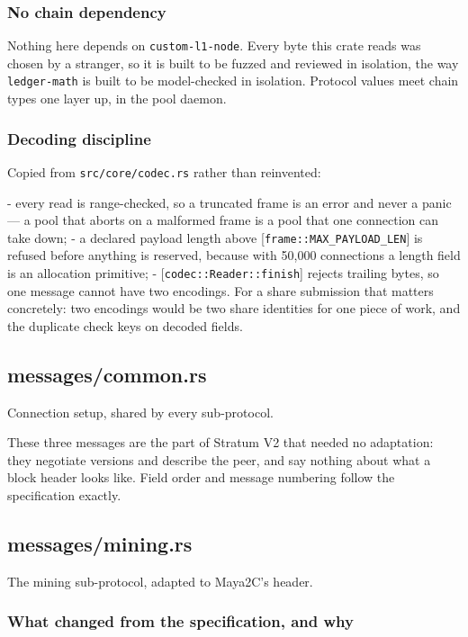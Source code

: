 \documentclass[11pt,a4paper]{article}
\begin{document}
\subsubsection{No chain dependency}

Nothing here depends on \texttt{custom-l1-node}. Every byte this crate reads was
chosen by a stranger, so it is built to be fuzzed and reviewed in isolation,
the way \texttt{ledger-math} is built to be model-checked in isolation. Protocol
values meet chain types one layer up, in the pool daemon.

\subsubsection{Decoding discipline}

Copied from \texttt{src/core/codec.rs} rather than reinvented:

- every read is range-checked, so a truncated frame is an error and never a
  panic — a pool that aborts on a malformed frame is a pool that one
  connection can take down;
- a declared payload length above [\texttt{frame::MAX\_PAYLOAD\_LEN}] is refused
  before anything is reserved, because with 50,000 connections a length
  field is an allocation primitive;
- [\texttt{codec::Reader::finish}] rejects trailing bytes, so one message cannot
  have two encodings. For a share submission that matters concretely: two
  encodings would be two share identities for one piece of work, and the
  duplicate check keys on decoded fields.

\subsection{messages/common.rs}
Connection setup, shared by every sub-protocol.

These three messages are the part of Stratum V2 that needed no adaptation:
they negotiate versions and describe the peer, and say nothing about what a
block header looks like. Field order and message numbering follow the
specification exactly.

\subsection{messages/mining.rs}
The mining sub-protocol, adapted to Maya2C's header.

\subsubsection{What changed from the specification, and why}
\end{document}
